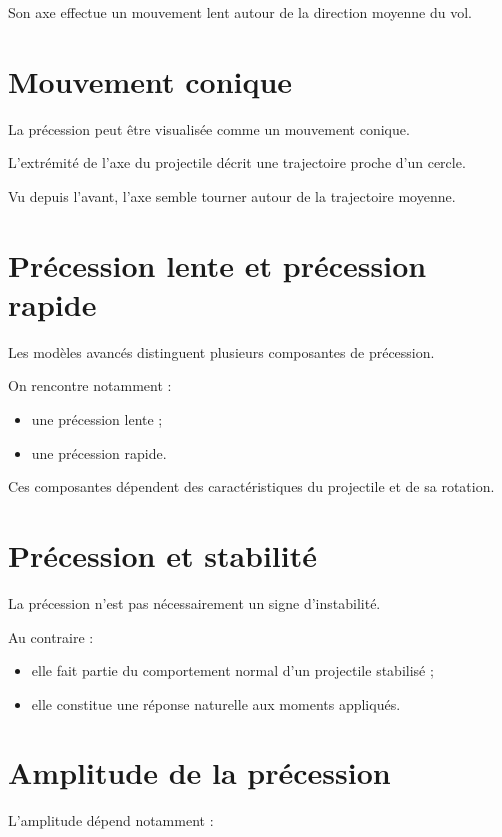 Son axe effectue un mouvement lent autour de la direction moyenne du vol.

\section{Mouvement conique}

La précession peut être visualisée comme un mouvement conique.

L'extrémité de l'axe du projectile décrit une trajectoire proche d'un cercle.

Vu depuis l'avant, l'axe semble tourner autour de la trajectoire moyenne.

\section{Précession lente et précession rapide}

Les modèles avancés distinguent plusieurs composantes de précession.

On rencontre notamment :

\begin{itemize}
    \item une précession lente ;
    \item une précession rapide.
\end{itemize}

Ces composantes dépendent des caractéristiques du projectile et de sa
rotation.

\section{Précession et stabilité}

La précession n'est pas nécessairement un signe d'instabilité.

Au contraire :

\begin{itemize}
    \item elle fait partie du comportement normal d'un projectile stabilisé ;
    \item elle constitue une réponse naturelle aux moments appliqués.
\end{itemize}

\section{Amplitude de la précession}

L'amplitude dépend notamment :

